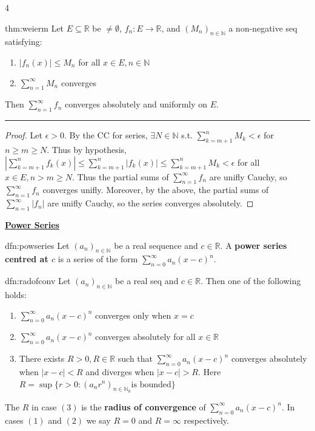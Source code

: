 \documentclass[landscape, 8pt]{extarticle}
\begin{document}
\begin{multicols*}{4}
		
		\begin{thm}{thm:weierm}{ }
		Let $E \subseteq \mathbb{R}$ be $\ne \emptyset$, $f_n: E \to \mathbb{R}$, and $(M_n)_{n\in \mathbb{N}}$ a non-negative seq satisfying:
		\begin{enumerate}[label=(\arabic*)]
			\item $\left|f_n(x)\right| \le M_n$ for all $x\in E, n\in \mathbb{N}$
			\vspace{1pt}
			\item $\sum_{n=1}^{\infty}M_n$ converges
		\end{enumerate}
		Then $\sum_{n=1}^{\infty}f_n$ converges absolutely and uniformly on $E$.
		\vspace{1pt}
		\hrule	
		\vspace{-6pt}
		\begin{proof}
			Let $\epsilon > 0$. By the CC for series, $\exists N\in \mathbb{N}$ s.t. $\sum_{k=m+1}^{n} M_k <\epsilon$ for $n \ge m \ge N$. Thus by hypothesis, $\left|\sum_{k=m+1}^{n} f_k(x)\right| \le \sum_{k=m+1}^{n}\left|f_k(x)\right| \le \sum_{k=m+1}^{n}M_k <\epsilon$ for all $x\in E, n > m \ge N$. Thus the partial sums of $\sum_{n=1}^{\infty}f_n$ are unifly Cauchy, so $\sum_{n=1}^{\infty}f_n$ converges unifly. Moreover, by the above, the partial sums of $\sum_{n=1}^{\infty}\left|f_n\right|$ are unifly Cauchy, so the series converges absolutely.
		\end{proof}
		
		\end{thm}
		
		
		
		{\tiny \textbf{\underline{Power Series}}}
		
		
		
		\begin{dfn}{dfn:powseries}{ }
		Let $(a_n)_{n\in \mathbb{N}}$ be a real sequence and $c\in \mathbb{R}$. A \textbf{power series centred at $c$} is a series of the form $\sum_{n=0}^{\infty}a_n(x-c)^n$.
		
		\end{dfn}
		
		
		\begin{dfn}{dfn:radofconv}{ }
		Let $(a_n)_{n\in \mathbb{N}}$ be a real seq and $c\in \mathbb{R}$. Then one of the following holds:
		\begin{enumerate}[label=(\arabic*)]
			\item $\sum_{n=0}^{\infty}a_n(x-c)^n$ converges only when $x = c$
			\item $\sum_{n=0}^{\infty}a_n(x-c)^n$ converges absolutely for all $x\in \mathbb{R}$
			\item There exists $R > 0, R\in \mathbb{R}$ such that $\sum_{n=0}^{\infty}a_n(x-c)^n$ converges absolutely when $\left|x - c\right| < R$ and diverges when $\left|x-c\right|> R$. Here $R = \sup\{r > 0 : (a_nr^n)_{n\in \mathbb{N}_0} \text{is bounded}\}$
		\end{enumerate}
		The $R$ in case $(3)$ is the \textbf{radius of convergence} of $\sum_{n=0}^{\infty}a_n(x-c)^n$. In cases $(1)$ and $(2)$ we say $R=0$ and $R = \infty$ respectively.
		

\end{dfn}
\end{multicols*}
\end{document}
